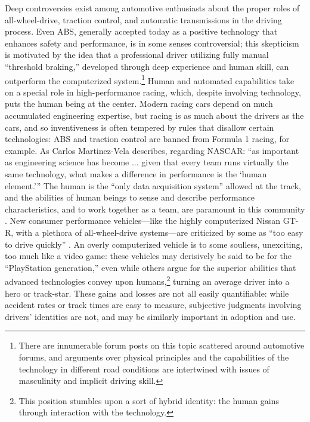 Deep controversies exist among automotive
enthusiasts about the proper roles of all-wheel-drive, traction
control, and automatic transmissions in the driving process. Even ABS,
generally accepted today as a positive technology that enhances safety and
performance, is in some senses controversial; this skepticism is
motivated by the idea that 
a professional driver utilizing fully manual ``threshold braking,''
developed through deep experience and human skill, can outperform the
computerized system.\footnote{There are innumerable forum posts on
  this topic scattered around automotive forums, and arguments over
  physical principles and the capabilities of the technology in
  different road conditions are
  intertwined with issues of masculinity and implicit driving skill.}
Human and automated capabilities take on a special role in
  high-performance racing, which, despite involving technology, puts the
  human being at the center. Modern racing cars depend on
much accumulated engineering expertise, but racing is as much about
the drivers as the cars, and so inventiveness is often tempered by
rules that disallow certain technologies:  ABS and traction control are
banned from Formula 1 racing, for example. As Carlos Martinez-Vela
describes, regarding NASCAR: ``as important as engineering science has
become ... given
that every team runs virtually the same technology, what makes a
difference in performance is the `human element.''' The human is the ``only data acquisition
system'' allowed at the track, and the abilities of human beings to
sense and describe performance characteristics, and to work together
as a team, are paramount in this community \cite[p.
  178]{martinezvela}. New consumer performance vehicles---like the 
highly computerized Nissan GT-R, with a plethora of all-wheel-drive
systems---are criticized by some as ``too easy to drive quickly'' \cite{edmunds}.
An overly computerized vehicle is to some soulless, unexciting, too much like
a video game: these vehicles may derisively be said to be for the
``PlayStation generation,'' even while others argue for the superior
abilities that advanced technologies convey upon humans,\footnote{This
  position stumbles upon a sort of hybrid 
  identity: the  human gains through
interaction with the technology.}
turning an average driver into a hero or track-star. These gains and
losses are not all easily quantifiable: while accident rates or track
times are easy to measure, subjective judgments involving drivers'
identities are not, and may be similarly important in adoption and use.

